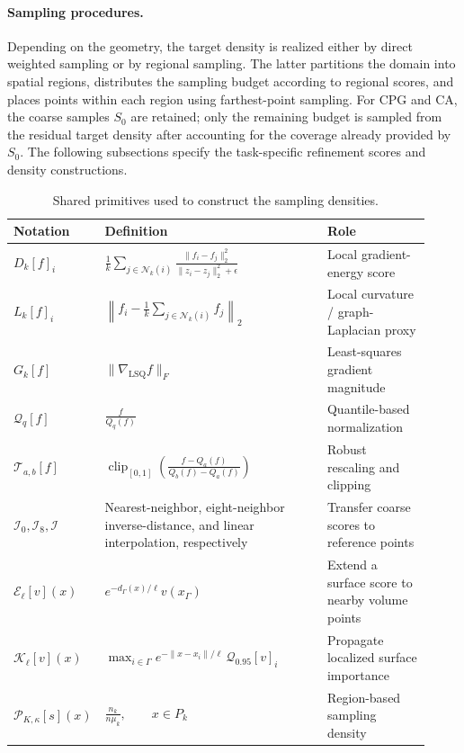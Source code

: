 \paragraph{Sampling procedures.}
Depending on the geometry, the target density is realized either by direct
weighted sampling or by regional sampling. The latter partitions the domain
into spatial regions, distributes the sampling budget according to regional
scores, and places points within each region using farthest-point sampling.
For CPG and CA, the coarse samples $S_0$ are retained; only the remaining
budget is sampled from the residual target density after accounting for the
coverage already provided by $S_0$. The following subsections specify the
task-specific refinement scores and density constructions.

\begin{table}[t]
\centering
\caption{Shared primitives used to construct the sampling densities.}
\label{tab:density_primitives}
\small
\begin{tabular}{@{}p{0.13\linewidth} p{0.54\linewidth} p{0.25\linewidth}@{}}
\toprule
Notation & Definition & Role \\
\midrule

$D_k[f]_i$
&
$\displaystyle
\frac{1}{k}\sum_{j\in\mathcal N_k(i)}
\frac{\|f_i-f_j\|_2^2}
     {\|z_i-z_j\|_2^2+\epsilon}
$
&
Local gradient-energy score
\\[1.2em]

$L_k[f]_i$
&
$\displaystyle
\left\|
f_i-\frac{1}{k}\sum_{j\in\mathcal N_k(i)}f_j
\right\|_2
$
&
Local curvature / graph-Laplacian proxy
\\[1.2em]

$G_k[f]$
&
$\displaystyle
\|\nabla_{\mathrm{LSQ}}f\|_F
$
&
Least-squares gradient magnitude
\\[0.8em]

$\mathcal Q_q[f]$
&
$\displaystyle
\frac{f}{Q_q(f)}
$
&
Quantile-based normalization
\\[1em]

$\mathcal T_{a,b}[f]$
&
$\displaystyle
\operatorname{clip}_{[0,1]}
\left(
\frac{f-Q_a(f)}
     {Q_b(f)-Q_a(f)}
\right)
$
&
Robust rescaling and clipping
\\[1.2em]

$\mathcal I_0,\mathcal I_8,\mathcal I$
&
Nearest-neighbor, eight-neighbor inverse-distance,
and linear interpolation, respectively
&
Transfer coarse scores to reference points
\\[0.8em]

$\mathcal E_\ell[v](x)$
&
$\displaystyle
e^{-d_\Gamma(x)/\ell}v(x_\Gamma)
$
&
Extend a surface score to nearby volume points
\\[1em]

$\mathcal K_\ell[v](x)$
&
$\displaystyle
\max_{i\in\Gamma}
e^{-\|x-x_i\|/\ell}\,
\mathcal Q_{0.95}[v]_i
$
&
Propagate localized surface importance
\\[1.2em]

$\mathcal P_{K,\kappa}[s](x)$
&
$\displaystyle
\frac{n_k}{n\mu_k},
\qquad x\in P_k
$
&
Region-based sampling density
\\

\bottomrule
\end{tabular}
\end{table}
